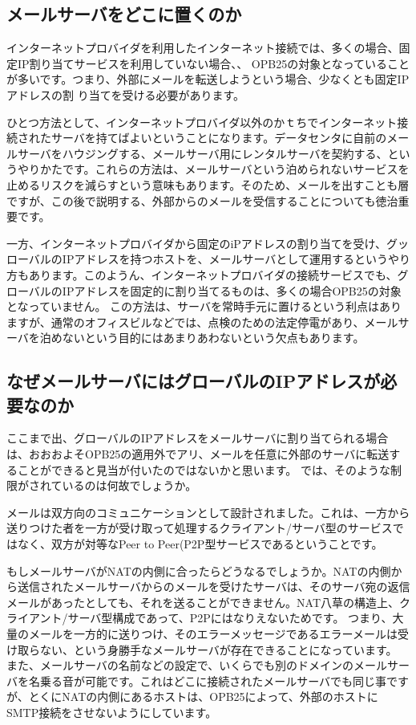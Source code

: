 {\subsection{メールサーバをどこに置くのか}
インターネットプロバイダを利用したインターネット接続では、多くの場合、固定IP割り当てサービスを利用していない場合、、
OPB25の対象となっていることが多いです。つまり、外部にメールを転送しようという場合、少なくとも固定IPアドレスの割
り当てを受ける必要があります。

ひとつ方法として、インターネットプロバイダ以外のかｔちでインターネット接続されたサーバを持てばよいということになります。データセンタに自前のメールサーバをハウジングする、メールサーバ用にレンタルサーバを契約する、というやりかたです。これらの方法は、メールサーバという泊められないサービスを止めるリスクを減らすという意味もあります。そのため、メールを出すことも層ですが、この後で説明する、外部からのメールを受信することについても徳治重要です。

一方、インターネットプロバイダから固定のiPアドレスの割り当てを受け、グッローバルのIPアドレスを持つホストを、メールサーバとして運用するというやり方もあります。このようん、インターネットプロバイダの接続サービスでも、グローバルのIPアドレスを固定的に割り当てるものは、多くの場合OPB25の対象となっていません。
この方法は、サーバを常時手元に置けるという利点はありますが、通常のオフィスビルなどでは、点検のための法定停電があり、メールサーバを泊めないという目的にはあまりあわないという欠点もあります。

\subsection{なぜメールサーバにはグローバルのIPアドレスが必要なのか}
ここまで出、グローバルのIPアドレスをメールサーバに割り当てられる場合は、おおおよそOPB25の適用外でアリ、メールを任意に外部のサーバに転送することができると見当が付いたのではないかと思います。
では、そのような制限がされているのは何故でしょうか。

メールは双方向のコミュニケーションとして設計されました。これは、一方から送りつけた者を一方が受け取って処理するクライアント/サーバ型のサービスではなく、双方が対等なPeer to Peer(P2P型サービスであるということです。

もしメールサーバがNATの内側に合ったらどうなるでしょうか。NATの内側から送信されたメールサーバからのメールを受けたサーバは、そのサーバ宛の返信メールがあったとしても、それを送ることができません。NAT八草の構造上、クライアント/サーバ型構成であって、P2Pにはなりえないためです。
つまり、大量のメールを一方的に送りつけ、そのエラーメッセージであるエラーメールは受け取らない、という身勝手なメールサーバが存在できることになっています。
また、メールサーバの名前などの設定で、いくらでも別のドメインのメールサーバを名乗る音が可能です。これはどこに接続されたメールサーバでも同じ事ですが、とくにNATの内側にあるホストは、OPB25によって、外部のホストにSMTP接続をさせないようにしています。

}
